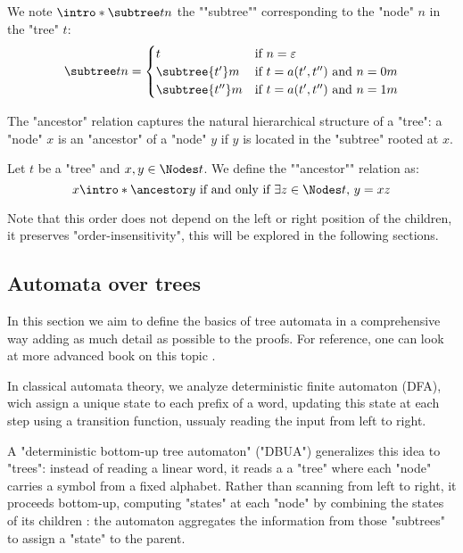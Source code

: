 \documentclass[a4paper,UKenglish,cleveref, autoref, thm-restate]{lipics-v2021}
\begin{document}
\begin{definition}
	\AP We note $\intro* \subtree t n$ the ""subtree"" corresponding to the "node" $n$ in the "tree" $t$:
	\[
		\subtree t n =   \begin{cases}
			t                & \text{if }  n = \varepsilon                  \\
			\subtree {t'} m  & \text{if } t = a(t',t'') \text{ and } n = 0m \\
			\subtree {t''} m & \text{if } t = a(t',t'') \text{ and } n = 1m
		\end{cases}
	\]
\end{definition}

The "ancestor" relation captures the natural hierarchical structure of a "tree": a "node" $x$ is an "ancestor"
of a "node" $y$ if $y$ is located in the "subtree" rooted at $x$.

\begin{definition}
	\AP Let $t$ be a "tree" and $x, y \in \Nodes t$. We define the ""ancestor"" relation as:
	\[
		x \intro* \ancestor y \tiff \exists z \in \Nodes t,\, y = xz
	\]
\end{definition}

\begin{remark}
	Note that this order does not depend on the left or right position of the children, \ie it preserves
	"order-insensitivity", this will be explored in the following sections.
\end{remark}


\subsection{Automata over trees}\label{sec:automata}

In this section we aim to define the basics of tree automata in a comprehensive way adding as much detail as possible to the proofs. For reference,
one can look at more advanced book on this topic \cite{tata,Thomas1997,bookautomata}.

In classical automata theory, we analyze deterministic finite automaton (DFA), wich assign a unique state to each prefix of
a word, updating this state at each step using a transition function, ussualy reading the input from left to right.

A "deterministic bottom-up tree automaton" ("DBUA") generalizes this idea to "trees": instead of reading a linear word, it reads a
a "tree" where each "node" carries a symbol from a fixed alphabet. Rather than scanning from left to right, it proceeds
bottom-up, computing "states" at each "node" by combining the states of its children :
the automaton aggregates the information from those "subtrees" to assign a "state" to the parent.
\end{document}
